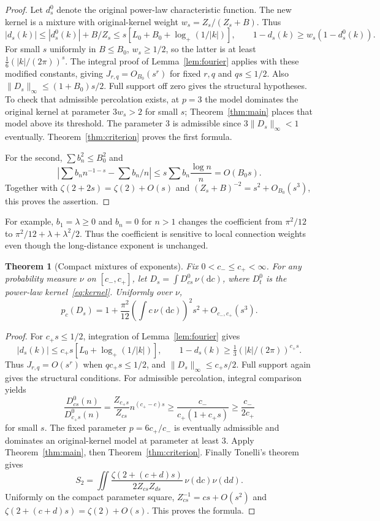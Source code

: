 \documentclass[11pt]{article}
\newtheorem{theorem}{Theorem}[section]
\theoremstyle{definition}
\begin{document}
\begin{proof}
Let $d_s^0$ denote the original power-law characteristic function.
The new kernel is a mixture with original-kernel weight
$w_s=Z_s/(Z_s+B)$. Thus
\[
 |d_s(k)|\le |d_s^0(k)|+B/Z_s
 \le s[L_0+B_0+\log_+(1/|k|)],
 \qquad 1-d_s(k)\ge w_s(1-d_s^0(k)).
\]
For small $s$ uniformly in $B\le B_0$, $w_s\ge1/2$, so the latter
is at least $\tfrac16(|k|/(2\pi))^s$. The integral proof of
Lemma~\ref{lem:fourier} applies with these modified constants, giving
$J_{r,q}=O_{B_0}(s^r)$ for fixed $r,q$ and $qs\le1/2$.
Also $\|D_s\|_\infty\le(1+B_0)s/2$. Full support off zero gives
the structural hypotheses. To check that admissible percolation exists,
at $p=3$ the model dominates the original kernel at parameter $3w_s>2$
for small $s$; Theorem~\ref{thm:main} places that model above its threshold.
The parameter $3$ is admissible since $3\|D_s\|_\infty<1$ eventually.
Theorem~\ref{thm:criterion} proves the first formula.

For the second, $\sum b_n^2\le B_0^2$ and
\[
 \left|\sum b_nn^{-1-s}-\sum b_n/n\right|
 \le s\sum b_n\frac{\log n}{n}=O(B_0s).
\]
Together with $\zeta(2+2s)=\zeta(2)+O(s)$ and
$(Z_s+B)^{-2}=s^2+O_{B_0}(s^3)$, this proves the assertion.
\end{proof}

For example, $b_1=\lambda\ge0$ and $b_n=0$ for $n>1$ changes the
coefficient from $\pi^2/12$ to $\pi^2/12+\lambda+\lambda^2/2$.
Thus the coefficient is sensitive to local connection weights even though the
long-distance exponent is unchanged.

\begin{theorem}[Compact mixtures of exponents]\label{thm:mixtures}
Fix $0<c_-\le c_+<\infty$. For any probability measure $\nu$ on
$[c_-,c_+]$, let $D_s=\int D^0_{cs}\,\nu(\mathrm dc)$, where
$D^0_t$ is the power-law kernel~\eqref{eq:kernel}. Uniformly over $\nu$,
\[
 p_c(D_s)=1+\frac{\pi^2}{12}\left(\int c\,\nu(\mathrm dc)\right)^2s^2
           +O_{c_-,c_+}(s^3).
\]
\end{theorem}

\begin{proof}
For $c_+s\le1/2$, integration of Lemma~\ref{lem:fourier} gives
\[
 |d_s(k)|\le c_+s[L_0+\log_+(1/|k|)],\qquad
 1-d_s(k)\ge\tfrac13(|k|/(2\pi))^{c_+s}.
\]
Thus $J_{r,q}=O(s^r)$ when $qc_+s\le1/2$, and
$\|D_s\|_\infty\le c_+s/2$. Full support again gives the structural
conditions. For admissible percolation, integral comparison yields
\[
 \frac{D^0_{cs}(n)}{D^0_{c_+s}(n)}
 =\frac{Z_{c_+s}}{Z_{cs}}n^{(c_+-c)s}
 \ge\frac{c_-}{c_+(1+c_+s)}\ge\frac{c_-}{2c_+}
\]
for small $s$. The fixed parameter $p=6c_+/c_-$ is eventually admissible
and dominates an original-kernel model at parameter at least $3$.
Apply Theorem~\ref{thm:main}, then Theorem~\ref{thm:criterion}.
Finally Tonelli's theorem gives
\[
 S_2=\iint\frac{\zeta(2+(c+d)s)}{2Z_{cs}Z_{ds}}
                  \,\nu(\mathrm dc)\nu(\mathrm dd).
\]
Uniformly on the compact parameter square, $Z_{cs}^{-1}=cs+O(s^2)$
and $\zeta(2+(c+d)s)=\zeta(2)+O(s)$. This proves the formula.
\end{proof}
\end{document}
